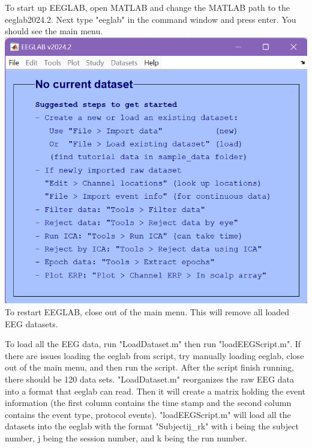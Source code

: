 \documentclass[12pt]{article}
\begin{document}
To start up EEGLAB, open MATLAB and change the MATLAB path to the eeglab2024.2. Next type "eeglab" in the command window and press enter. You should see the main menu.\newline
\includegraphics[scale=0.4]{EEGLABMainMenu}\newline
To restart EEGLAB, close out of the main menu. This will remove all loaded EEG datasets.

To load all the EEG data, run "LoadDataset.m" then run "loadEEGScript.m". If there are issues loading the eeglab from script, try manually loading eeglab, close out of the main menu, and then run the script. After the script finish running, there should be 120 data sets.
"LoadDataset.m" reorganizes the raw EEG data into a format that eeglab can read. Then it will create a matrix holding the event information (the first column contains the time stamp and the second column contains the event type, protocol events).
"loadEEGScript.m" will load all the datasets into the eeglab with the format "Subjectij\_rk" with i being the subject number, j being the session number, and k being the run number.
\end{document}
